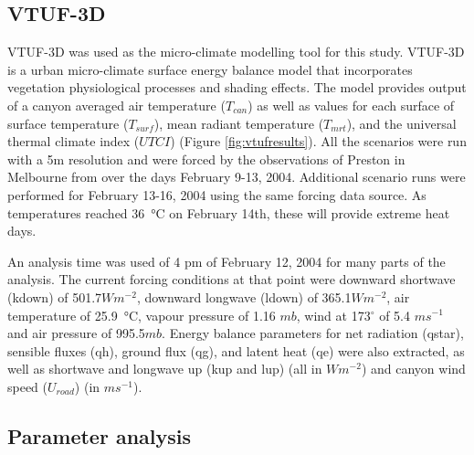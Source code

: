 \documentclass[final,3p,times,authoryear]{elsarticle}
\begin{document}
\subsection{VTUF-3D}\label{sec:methodsvtuf}
VTUF-3D \citep{Nice2018a} was used as the micro-climate modelling tool for this study. VTUF-3D is a urban micro-climate surface energy balance model that incorporates vegetation physiological processes and shading effects. The model provides output of a canyon averaged air temperature ($T_{can}$) as well as values for each surface of surface temperature ($T_{surf}$), mean radiant temperature ($T_{mrt}$), and the universal thermal climate index ($UTCI$) (Figure \ref{fig:vtufresults}). All the scenarios were run with a 5m resolution and were forced by the observations of Preston in Melbourne from \cite{Coutts2007} over the days February 9-13, 2004. Additional scenario runs were performed for February 13-16, 2004 using the same forcing data source. As temperatures reached 36\SI{}{\degreeCelsius} on February 14th, these will provide extreme heat days.


An analysis time was used of 4 pm of February 12, 2004 for many parts of the analysis. The current forcing conditions at that point were downward shortwave (\gls{kdown}) of 501.7$Wm^{-2}$, downward longwave (\gls{ldown}) of 365.1$Wm^{-2}$, air temperature of 25.9\SI{}{\degreeCelsius}, vapour pressure of 1.16 $mb$, wind at 173$^{\circ}$ of 5.4 $ms^{-1}$ and air pressure of 995.5$mb$. Energy balance parameters for net radiation (\gls{qstar}), sensible fluxes (\gls{qh}), ground flux (\gls{qg}), and latent heat (\gls{qe}) were also extracted, as well as shortwave and longwave up (\gls{kup} and \gls{lup}) (all in $Wm^{-2}$) and canyon wind speed ($U_{road}$) (in $ms^{-1}$).


\subsection{Parameter analysis}\label{sec:methodsparam}
\end{document}
